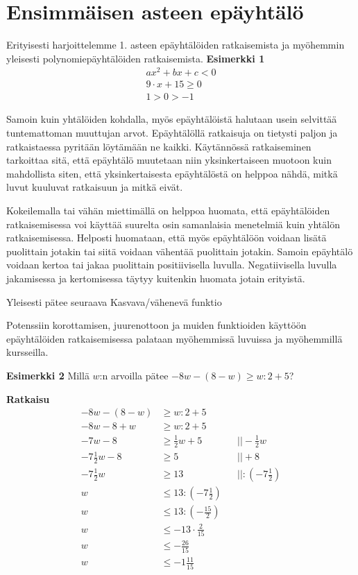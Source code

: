 \section{Ensimmäisen asteen epäyhtälö}

Erityisesti harjoittelemme 1. asteen epäyhtälöiden ratkaisemista ja myöhemmin yleisesti polynomiepäyhtälöiden ratkaisemista.
\textbf{Esimerkki 1}
\begin{align*}
ax^2+bx+c<0 \\
9 \cdot x+15\geq 0 \\
1>0>-1
\end{align*}

Samoin kuin yhtälöiden kohdalla, myös epäyhtälöistä halutaan usein selvittää
tuntemattoman muuttujan arvot. Epäyhtälöllä ratkaisuja on tietysti paljon ja ratkaistaessa
pyritään löytämään ne kaikki. Käytännössä ratkaiseminen tarkoittaa sitä, että epäyhtälö
muutetaan niin yksinkertaiseen muotoon kuin mahdollista siten, että yksinkertaisesta epäyhtälöstä
on helppoa nähdä, mitkä luvut kuuluvat ratkaisuun ja mitkä eivät.

Kokeilemalla tai vähän miettimällä on helppoa huomata, että epäyhtälöiden ratkaisemisessa
voi käyttää suurelta osin samanlaisia menetelmiä kuin yhtälön ratkaisemisessa. Helposti huomataan,
että myös epäyhtälöön voidaan lisätä puolittain jotakin tai siitä voidaan vähentää puolittain jotakin.
Samoin epäyhtälö voidaan kertoa tai jakaa puolittain positiivisella luvulla. Negatiivisella luvulla
jakamisessa ja kertomisessa täytyy kuitenkin huomata jotain erityistä.


Yleisesti pätee seuraava
	Kasvava/vähenevä funktio

    \begin{kuvaajapohja}{2}{-1}{1}{-1}{1}
    \end{kuvaajapohja}

    \begin{kuvaajapohja}{0.5}{-4}{4}{-4}{4}
    \end{kuvaajapohja}


Potenssiin korottamisen, juurenottoon ja muiden funktioiden käyttöön epäyhtälöiden ratkaisemisessa palataan myöhemmissä luvuissa ja myöhemmillä kursseilla.

\textbf{Esimerkki 2}
Millä $w$:n arvoilla pätee $-8w-(8-w)\geq w:2+5$?

\textbf{Ratkaisu}
\begin{align*}
-8w-(8-w)&\geq w:2+5 \\
-8w-8+w&\geq w:2+5 \\
-7w-8&\geq \frac12 w+5  \ \ \ \ \ &&|| -\frac12 w \\
-7\frac12 w-8&\geq 5  \ \ \ \ \ &&|| +8 \\
-7\frac12 w&\geq 13  \ \ \ \ \ &&|| :(-7\frac12) \\
w&\leq 13:(-7\frac12) \\
w&\leq 13:(-\frac{15}{2}) \\
w&\leq -13\cdot \frac{2}{15} \\
w&\leq -\frac{26}{15} \\
w&\leq -1\frac{11}{15}
\end{align*}


